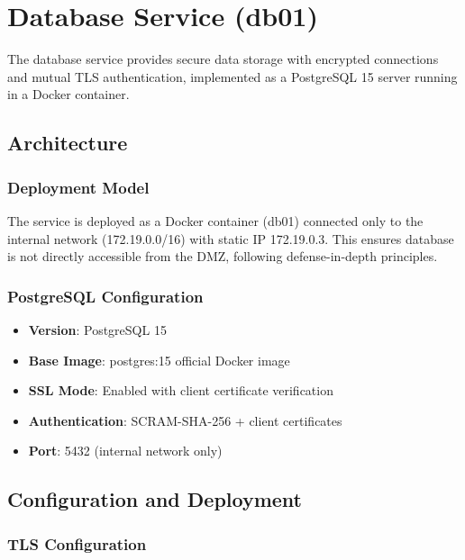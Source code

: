 
\section{Database Service (db01)}

The database service provides secure data storage with encrypted connections and mutual TLS authentication, implemented as a PostgreSQL 15 server running in a Docker container.

\subsection{Architecture}

\subsubsection{Deployment Model}

The service is deployed as a Docker container (db01) connected only to the internal network (172.19.0.0/16) with static IP 172.19.0.3. This ensures database is not directly accessible from the DMZ, following defense-in-depth principles.

\subsubsection{PostgreSQL Configuration}

\begin{itemize}
    \item \textbf{Version}: PostgreSQL 15
    \item \textbf{Base Image}: postgres:15 official Docker image
    \item \textbf{SSL Mode}: Enabled with client certificate verification
    \item \textbf{Authentication}: SCRAM-SHA-256 + client certificates
    \item \textbf{Port}: 5432 (internal network only)
\end{itemize}

\subsection{Configuration and Deployment}

\subsubsection{TLS Configuration}


